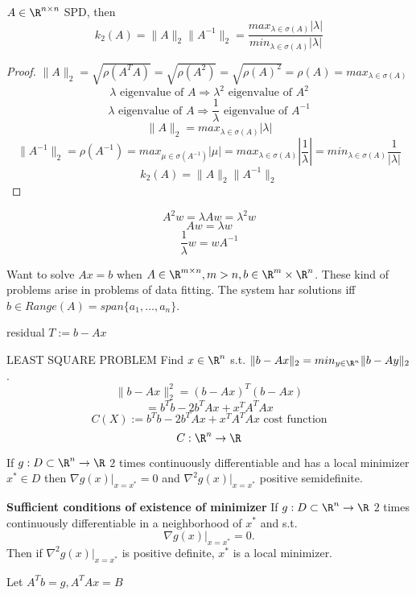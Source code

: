 \begin{exercise}
  $A\in \R^{n\times n}$ SPD, then
    $$k_2(A)=\| A \|_{2} \| A ^{-1} \|_{2} = \frac{max_{\lambda \in \sigma(A)}|\lambda|}{min_{\lambda\in \sigma(A)}|\lambda|}$$
\end{exercise}
\begin{proof}
  $\| A \|_{2} =\sqrt{\rho(A^TA)}=\sqrt{\rho(A^2)}=\sqrt{\rho(A)^2}=\rho(A)=max_{\lambda\in \sigma(A)}$
  $$\lambda \text{ eigenvalue of }A \Rightarrow \lambda^2 \text{ eigenvalue of }A^2$$
  $$\lambda \text{ eigenvalue of }A \Rightarrow \frac{1}{\lambda} \text{ eigenvalue of }A ^{-1}$$
  $$\| A \|_{2} =max_{\lambda\in\sigma(A)}|\lambda|$$
  $$\| A^{-1} \|_{2} =\rho(A ^{-1} )=max_{\mu\in\sigma(A^{-1})}|\mu|=max_{\lambda\in \sigma(A)}|\frac{1}{\lambda}|=min_{\lambda\in \sigma(A)}\frac{1}{|\lambda|}$$
  $$k_2(A)=\| A \|_{2} \| A^{-1} \|_{2} $$
    \qedhere
\end{proof}
\begin{remark}
  $$A^2w=\lambda Aw=\lambda^2 w$$
  $$Aw=\lambda w$$
  $$\frac{1}{\lambda}w=wA ^{-1}$$
\end{remark}
Want to solve $Ax=b$ when $A\in \R^{m\times n}, m>n, b\in\R^m\times \R^n$.
\newline These kind of problems arise in problems of data fitting.
\newline The system har solutions iff $b\in Range(A)=span\{a_1,\dots,a_n\}$.
\begin{definition}
  residual $T:=b-Ax$
\end{definition}
LEAST SQUARE PROBLEM
\newline Find $x\in \R^n$ s.t. $\| b-Ax \|_{2} =min_{y\in \R^n}\| b-Ay \|_{2}$.
$$\| b-Ax \|_{2}^2=(b-Ax)^T(b-Ax)$$
$$=b^Tb-2b^TAx+x^TA^TAx$$
$$C(X):=b^Tb-2b^TAx+x^TA^TAx \text{ cost function}$$
$$C: \R^n\to\R$$
\begin{recall}
  If $g:D\subset \R^n\to \R$ $2$ times continuously differentiable and has a local minimizer $x^*\in D$ then $\nabla g(x)\rvert_{x=x^*}=0$ and $\nabla^2g(x)\rvert_{x=x^*}$ positive semidefinite.
\end{recall}
\begin{theorem}
  \textbf{Sufficient conditions of existence of minimizer}
  If $g:D\subset \R^n\to \R$ $2$ times continuously differentiable in a neighborhood of $x^*$ and s.t.
    $$\nabla g(x)\rvert_{x=x^*}=0.$$
    Then if $\nabla^2g(x)\rvert_{x=x^*}$ is positive definite, $x^*$ is a local minimizer.
\end{theorem}
Let $A^Tb=g, A^TAx=B$ \newline
